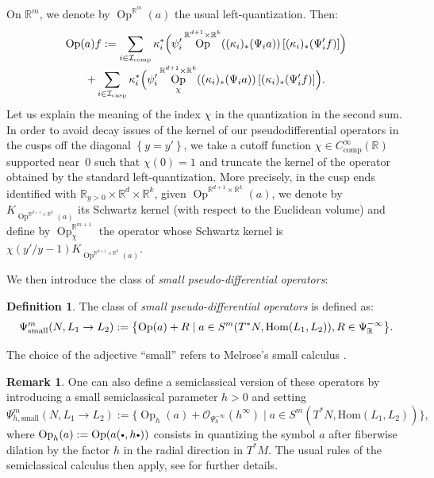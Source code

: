 \documentclass[10pt]{amsart}
\let\ra\rightarrow
\newcommand{\sbullet}{{\scriptscriptstyle\bullet}}
\newcommand{\csbullet}{{\raisebox{1pt}{$\sbullet$}}}
\newcommand{\R}{\mathbb{R}}
\newcommand{\mc}{\mathcal}
\DeclareMathOperator{\Op}{Op}
\theoremstyle{plain}
\theoremstyle{definition}
\newtheorem{definition}{Definition}[section]
\newtheorem{remark}{Remark}[section]
\begin{document}
On $\R^{m}$, we denote by $\Op^{\R^{m}}(a)$ the usual left-quantization. Then:
\begin{multline}
\label{equation:quantization}
\Op(a)f := \sum_{i \in \mc{I}_{\mathrm{comp}}} \kappa_i^*\Bigl( \psi'_i \Op^{\R^{d+1} \times \R^k}( (\kappa_i)_*(\Psi_i a))\left[(\kappa_i)_*(\Psi'_i f) \right] \Bigr) \\[-3pt]
+ \sum_{i \in \mc{I}_{\mathrm{cusp}}} \kappa_i^*\Bigl( \psi'_i \Op^{\R^{d+1} \times \R^k}_{\chi}( (\kappa_i)_*(\Psi_i a))\left[(\kappa_i)_*(\Psi'_i f) \right] \Bigr).
\end{multline}
Let us explain the meaning of the index $\chi$ in the quantization in the second sum. In order to avoid decay issues of the kernel of our pseudodifferential operators in the cusps off the diagonal $\left\{y = y'\right\}$, we take a cutoff function $\chi \in C^\infty_{\mathrm{comp}}(\R)$ supported near~$0$ such that $\chi(0)=1$ and truncate the kernel of the operator obtained by the standard left-quantization. More precisely, in the cusp ends identified with $\R_{y > 0} \times \R^d \times \R^k$, given $\Op^{\R^{d+1} \times \R^k}(a)$, we denote by $K_{\Op^{\R^{d+1} \times \R^k}(a)}$ its Schwartz kernel (with respect to the Euclidean volume) and define by $\Op^{\R^{m+1}}_\chi$ the operator whose Schwartz kernel is $\chi(y'/y-1)K_{\Op^{\R^{d+1} \times \R^k}(a)}$.

We then introduce the class of \emph{small pseudo-differential operators}:

\begin{definition}
\label{definition:small}
The class of \emph{small pseudo-differential operators} is defined as:
\[
\Psi^m_{\textup{small}}(N, L_1\ra L_2) := \bigl\{ \Op(a) + R \mid a\in S^m(T^\ast N, \mathrm{Hom}(L_1,L_2)), R\in \Psi^{-\infty}_{\R} \bigr\}.
\]
\end{definition}

The choice of the adjective ``small'' refers to Melrose's small calculus \cite{Melrose-APS-93}.

\begin{remark}
\label{remark:semiclassical} One can also define a semiclassical version of these operators by introducing a small semiclassical parameter $h > 0$ and setting
\[
\Psi^m_{h,\text{small}}(N, L_1\ra L_2) := \bigl\{ \Op_h(a) + \mc{O}_{\Psi^{-\infty}_h}(h^\infty) \mid a\in S^m(T^\ast N, \mathrm{Hom}(L_1,L_2)) \bigr\},
\]
where $\Op_h(a) := \Op(a(\csbullet, h \csbullet))$ consists in quantizing the symbol $a$ after fiberwise dilation by the factor $h$ in the radial direction in $T^*M$. The usual rules of the semiclassical calculus then apply, see \cite{Bonthonneau-16} for further details.
\end{remark}
\end{document}
